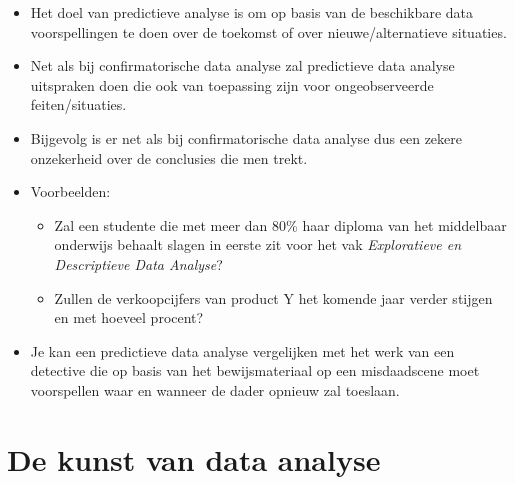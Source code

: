 \documentclass[]{memoir}
\providecommand{\tightlist}{%
  \setlength{\itemsep}{0pt}\setlength{\parskip}{0pt}}
\begin{document}
\begin{itemize}
\tightlist
\item
  Het doel van predictieve analyse is om op basis van de beschikbare
  data voorspellingen te doen over de toekomst of over
  nieuwe/alternatieve situaties.
\item
  Net als bij confirmatorische data analyse zal predictieve data analyse
  uitspraken doen die ook van toepassing zijn voor ongeobserveerde
  feiten/situaties.
\item
  Bijgevolg is er net als bij confirmatorische data analyse dus een
  zekere onzekerheid over de conclusies die men trekt.
\item
  Voorbeelden:

  \begin{itemize}
  \tightlist
  \item
    Zal een studente die met meer dan 80\% haar diploma van het
    middelbaar onderwijs behaalt slagen in eerste zit voor het vak
    \emph{Exploratieve en Descriptieve Data Analyse}?
  \item
    Zullen de verkoopcijfers van product Y het komende jaar verder
    stijgen en met hoeveel procent?
  \end{itemize}
\item
  Je kan een predictieve data analyse vergelijken met het werk van een
  detective die op basis van het bewijsmateriaal op een misdaadscene
  moet voorspellen waar en wanneer de dader opnieuw zal toeslaan.
\end{itemize}

\section{De kunst van data analyse}\label{de-kunst-van-data-analyse}
\end{document}
